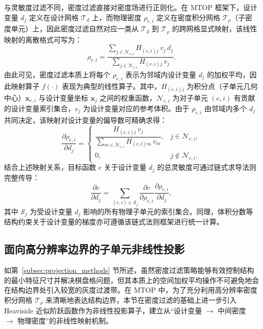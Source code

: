 与灵敏度过滤不同，密度过滤直接对密度场进行正则化。在 MTOP 框架下，设计变量 $d_j$ 定义在设计网格 $\mathcal{T}_d$ 上，而物理密度 $\rho_{e,i}$ 定义在密度积分网格 $\mathcal{T}_\rho$（子密度单元）上，因此密度过滤自然对应一类从 $\mathcal{T}_d$ 到 $\mathcal{T}_\rho$ 的跨网格显式映射，该线性映射的离散格式可写为：
\begin{equation} \label{eq:ch4_mtop_density_mapping}
	\rho_{e,i} = \frac{\sum\limits_{j \in \mathcal{N}_{e,i}} H_{(e,i)j}\, v_j\, d_j}{\sum\limits_{j \in \mathcal{N}_{e,i}} H_{(e,i)j}\, v_j}.
\end{equation}
由此可见，密度过滤本质上将每个 $\rho_{e,i}$ 表示为邻域内设计变量 $d_j$ 的加权平均，因此映射算子 $f(\cdot)$ 表现为典型的线性算子。其中，$H_{(e,i)j}$ 为积分点（子单元几何中心）$\boldsymbol{x}_{e,i}$ 与设计变量坐标 $\boldsymbol{x}_j$ 之间的权重函数，$\mathcal{N}_{e,i}$ 为对子单元 $(e,i)$ 有贡献的设计变量索引集合，$v_j$ 为设计变量对应的参考体积。由于 $\rho_{e,i}$ 由邻域内多个 $d_j$ 共同决定，该映射对设计变量的偏导数可精确求得：
\begin{equation} \label{eq:ch4_mtop_density_filter_deriv}
	\frac{\partial \rho_{e,i}}{\partial d_j} = 
	\begin{cases} 
		\dfrac{H_{(e,i)j}\, v_j}{\sum\limits_{m \in \mathcal{N}_{e,i}} H_{(e,i)m}\, v_m}, & j \in \mathcal{N}_{e,i}, \\[1.5em] 
		0, & j \notin \mathcal{N}_{e,i}. 
	\end{cases}
\end{equation}
结合上述映射关系，目标函数 $c$ 关于设计变量 $d_j$ 的总灵敏度可通过链式求导法则完整传导：
\begin{equation} \label{eq:ch4_mtop_density_filter_chain}
	\frac{\partial c}{\partial d_j} = \sum_{(e,i) \in \mathcal{S}_j} \frac{\partial c}{\partial \rho_{e,i}} \frac{\partial \rho_{e,i}}{\partial d_j},
\end{equation}
其中 $\mathcal{S}_j$ 为受设计变量 $d_j$ 影响的所有物理子单元的索引集合。同理，体积分数等结构约束关于设计变量的梯度亦可遵循该链式法则框架进行统一计算。


\subsection{面向高分辨率边界的子单元非线性投影}
\label{subsec:mapping-heaviside-nonlinear}

如第~\ref{subsec:projection_methods} 节所述，虽然密度过滤策略能够有效控制结构的最小特征尺寸并解决棋盘格问题，但其本质上的空间加权平均操作不可避免地会在结构边界处引入较宽的灰度过渡带。在 MTOP 中，为了充分利用高分辨率密度积分网格 $\mathcal{T}_{\rho}$ 来清晰地表达结构边界，本节在密度过滤的基础上进一步引入 Heaviside 近似阶跃函数作为非线性投影算子，建立从“设计变量 $\to$ 中间密度 $\to$ 物理密度”的非线性映射机制。


